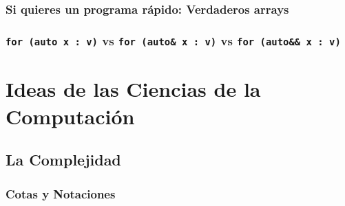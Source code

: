 \documentclass[12pt, fleqn]{report}                             %
\theoremstyle{break}                                            %
\newcommand{\textCode}[1]  { \texttt{#1} }                      %
\begin{document}
        \section{Si quieres un programa rápido: Verdaderos arrays}  

        \clearpage
        \section{ \textCode{for (auto x : v)} vs \textCode{for (auto\& x : v)} vs \textCode{for (auto\&\& x : v)} }  
            


\part{Ideas de las Ciencias de la Computación}
\label{part:IdeasDeCienciasDeLaComputacion}
    

    \clearpage
    \chapter{La Complejidad}

        \section{Cotas y Notaciones}

\end{document}
